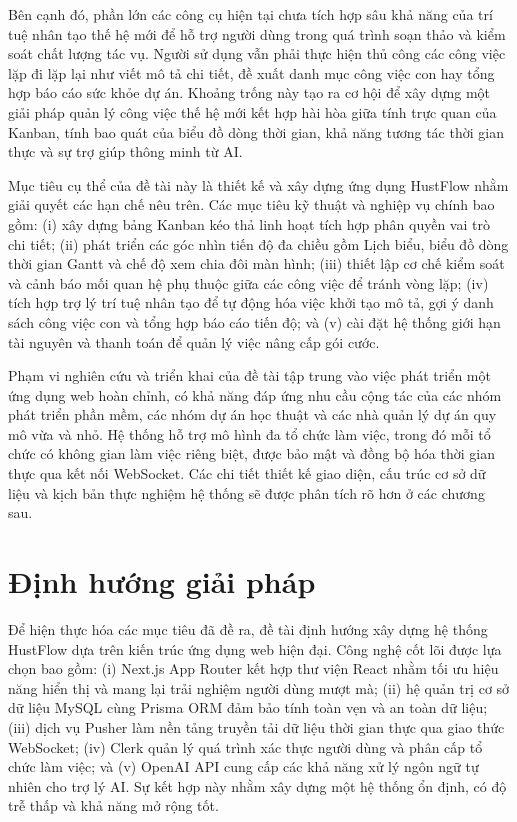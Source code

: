 \documentclass[../DoAn.tex]{subfiles}
\begin{document}
Bên cạnh đó, phần lớn các công cụ hiện tại chưa tích hợp sâu khả năng của trí tuệ nhân tạo thế hệ mới để hỗ trợ người dùng trong quá trình soạn thảo và kiểm soát chất lượng tác vụ. Người sử dụng vẫn phải thực hiện thủ công các công việc lặp đi lặp lại như viết mô tả chi tiết, đề xuất danh mục công việc con hay tổng hợp báo cáo sức khỏe dự án. Khoảng trống này tạo ra cơ hội để xây dựng một giải pháp quản lý công việc thế hệ mới kết hợp hài hòa giữa tính trực quan của Kanban, tính bao quát của biểu đồ dòng thời gian, khả năng tương tác thời gian thực và sự trợ giúp thông minh từ AI.

Mục tiêu cụ thể của đề tài này là thiết kế và xây dựng ứng dụng HustFlow nhằm giải quyết các hạn chế nêu trên. Các mục tiêu kỹ thuật và nghiệp vụ chính bao gồm: (i) xây dựng bảng Kanban kéo thả linh hoạt tích hợp phân quyền vai trò chi tiết; (ii) phát triển các góc nhìn tiến độ đa chiều gồm Lịch biểu, biểu đồ dòng thời gian Gantt và chế độ xem chia đôi màn hình; (iii) thiết lập cơ chế kiểm soát và cảnh báo mối quan hệ phụ thuộc giữa các công việc để tránh vòng lặp; (iv) tích hợp trợ lý trí tuệ nhân tạo để tự động hóa việc khởi tạo mô tả, gợi ý danh sách công việc con và tổng hợp báo cáo tiến độ; và (v) cài đặt hệ thống giới hạn tài nguyên và thanh toán để quản lý việc nâng cấp gói cước.

Phạm vi nghiên cứu và triển khai của đề tài tập trung vào việc phát triển một ứng dụng web hoàn chỉnh, có khả năng đáp ứng nhu cầu cộng tác của các nhóm phát triển phần mềm, các nhóm dự án học thuật và các nhà quản lý dự án quy mô vừa và nhỏ. Hệ thống hỗ trợ mô hình đa tổ chức làm việc, trong đó mỗi tổ chức có không gian làm việc riêng biệt, được bảo mật và đồng bộ hóa thời gian thực qua kết nối WebSocket. Các chi tiết thiết kế giao diện, cấu trúc cơ sở dữ liệu và kịch bản thực nghiệm hệ thống sẽ được phân tích rõ hơn ở các chương sau.

\section{Định hướng giải pháp}
\label{section:1.3}

Để hiện thực hóa các mục tiêu đã đề ra, đề tài định hướng xây dựng hệ thống HustFlow dựa trên kiến trúc ứng dụng web hiện đại. Công nghệ cốt lõi được lựa chọn bao gồm: (i) Next.js App Router kết hợp thư viện React nhằm tối ưu hiệu năng hiển thị và mang lại trải nghiệm người dùng mượt mà; (ii) hệ quản trị cơ sở dữ liệu MySQL cùng Prisma ORM đảm bảo tính toàn vẹn và an toàn dữ liệu; (iii) dịch vụ Pusher làm nền tảng truyền tải dữ liệu thời gian thực qua giao thức WebSocket; (iv) Clerk quản lý quá trình xác thực người dùng và phân cấp tổ chức làm việc; và (v) OpenAI API cung cấp các khả năng xử lý ngôn ngữ tự nhiên cho trợ lý AI. Sự kết hợp này nhằm xây dựng một hệ thống ổn định, có độ trễ thấp và khả năng mở rộng tốt.
\end{document}
